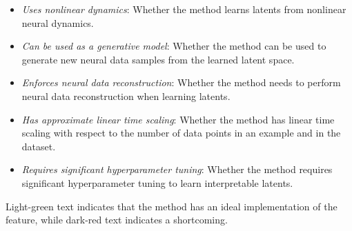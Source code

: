 \begin{itemize}
    \item \textit{Uses nonlinear dynamics}: Whether the method learns latents from  nonlinear neural dynamics.
    \item \textit{Can be used as a generative model}: Whether the method can be used to generate new neural data samples from the learned latent space.
    \item \textit{Enforces neural data reconstruction}: Whether the method needs to perform neural data reconstruction when learning latents.
    \item \textit{Has approximate linear time scaling}: Whether the method has linear time scaling with respect to the number of data points in an example and in the dataset.
    \item \textit{Requires significant hyperparameter tuning}: Whether the method requires significant hyperparameter tuning to learn interpretable latents.
\end{itemize}

Light-green text indicates that the method has an ideal implementation of the feature, while dark-red text indicates a shortcoming.

\newcommand{\goodQual}[1]{\textcolor{green}{#1}}
\newcommand{\badQual}[1]{\textcolor{cb_red}{#1}}
\newcommand*\rot[1]{\rotatebox{90}{\parbox{3cm}{\centering\small #1}}}

